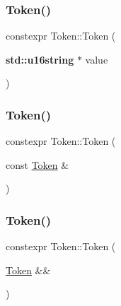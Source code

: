 \subsubsection{\texorpdfstring{Token()}{Token()}\hspace{0.1cm}{\footnotesize\ttfamily [8/10]}}
{\footnotesize\ttfamily constexpr Token\+::\+Token (\begin{DoxyParamCaption}\item[{\textbf{ std\+::u16string} $\ast$}]{value }\end{DoxyParamCaption})\hspace{0.3cm}{\ttfamily [inline]}}

\mbox{\label{class_token_a6cf4d1944e2b5714735ed54e3f9651d0}} 
\subsubsection{\texorpdfstring{Token()}{Token()}\hspace{0.1cm}{\footnotesize\ttfamily [9/10]}}
{\footnotesize\ttfamily constexpr Token\+::\+Token (\begin{DoxyParamCaption}\item[{const \hyperlink{class_token}{Token} \&}]{ }\end{DoxyParamCaption})\hspace{0.3cm}{\ttfamily [default]}}

\mbox{\label{class_token_a23120d04c491e1808de2c15a5f9de2a1}} 
\subsubsection{\texorpdfstring{Token()}{Token()}\hspace{0.1cm}{\footnotesize\ttfamily [10/10]}}
{\footnotesize\ttfamily constexpr Token\+::\+Token (\begin{DoxyParamCaption}\item[{\hyperlink{class_token}{Token} \&\&}]{ }\end{DoxyParamCaption})\hspace{0.3cm}{\ttfamily [default]}}

\mbox{\label{class_token_aa192083f24d5d5895ad91b20ff0e3399}} 
